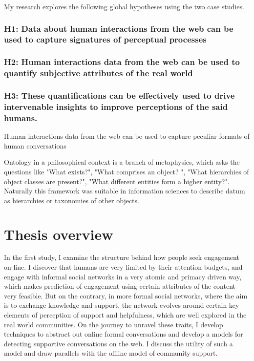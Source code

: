 My research explores the following global hypotheses using the two case studies. 

\subsubsection{H1: Data about human interactions from the web can be used to capture signatures of perceptual processes  } 


\subsubsection{H2: Human interactions data from the web can be used to quantify subjective attributes of the real world}

\subsubsection{H3: These quantifications can be effectively used to drive intervenable insights to improve perceptions of the said humans. }



Human interactions data from the web can be used to capture peculiar formats of human conversations



Ontology in a philosophical context is a branch of metaphysics, which asks the questions like "What exists?", "What comprises an object? ", "What hierarchies of object classes are present?", "What different entities form a higher entity?". Naturally this framework was suitable in information sciences to describe datum as hierarchies or taxonomies of other objects. 



\section{Thesis overview}

In the first study, I examine the structure behind how people seek engagement on-line. I discover that humans are very limited by their attention budgets, and engage with informal social networks in a very atomic and primacy driven way, which makes prediction of engagement using certain attributes of the content very feasible. But on the contrary, in more formal social networks, where the aim is to exchange knowledge and support, the network evolves around certain key elements of perception of support and helpfulness, which are well explored in the real world communities. On the journey to unravel these traits, I develop techniques to abstract out online formal conversations and develop a models for detecting supportive conversations on the web. I discuss the utility of such a model and draw parallels with the offline model of community support. 

